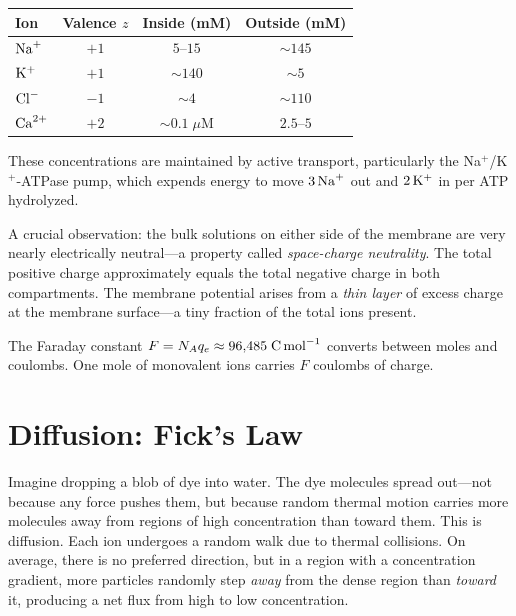\begin{center}
\begin{tabular}{@{}lccc@{}}
  \toprule
  \textbf{Ion} & \textbf{Valence} $z$ & \textbf{Inside} (mM) & \textbf{Outside} (mM) \\
  \midrule
  $\mathrm{Na}^+$   & $+1$ & $5$--$15$     & $\sim 145$  \\
  $\mathrm{K}^+$    & $+1$ & $\sim 140$    & $\sim 5$    \\
  $\mathrm{Cl}^-$   & $-1$ & $\sim 4$      & $\sim 110$  \\
  $\mathrm{Ca}^{2+}$   & $+2$ & $\sim 0.1\;\mu\text{M}$ & $2.5$--$5$ \\
  \bottomrule
\end{tabular}
\end{center}

These concentrations are maintained by active transport, particularly the Na$^+$/K$^+$-ATPase pump, which expends energy to move $3\,\mathrm{Na}^+$ out and $2\,\mathrm{K}^+$ in per ATP hydrolyzed.

A crucial observation: the bulk solutions on either side of the membrane are very nearly electrically neutral---a property called \emph{space-charge neutrality}. The total positive charge approximately equals the total negative charge in both compartments. The membrane potential arises from a \emph{thin layer} of excess charge at the membrane surface---a tiny fraction of the total ions present.

The Faraday constant $F = N_A q_e \approx 96{,}485\;\text{C\,mol}^{-1}$ converts between moles and coulombs. One mole of monovalent ions carries $F$ coulombs of charge.

\section{Diffusion: Fick's Law}
\label{sec:diffusion}

Imagine dropping a blob of dye into water. The dye molecules spread out---not because any force pushes them, but because random thermal motion carries more molecules away from regions of high concentration than toward them. This is diffusion. Each ion undergoes a random walk due to thermal collisions. On average, there is no preferred direction, but in a region with a concentration gradient, more particles randomly step \emph{away} from the dense region than \emph{toward} it, producing a net flux from high to low concentration.

